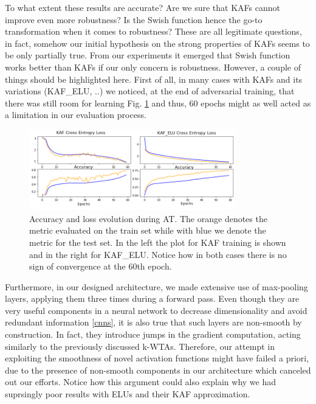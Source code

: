 \documentclass[LaM,binding=0.6cm]{./packages/sapthesis/sapthesis}
\begin{document}
        To what extent these results are accurate? Are we sure that KAFs cannot improve even more robustness?
        Is the Swish function hence the go-to transformation when it comes to robustness? These are all 
        legitimate questions, in fact, somehow our initial hypothesis on the strong properties of KAFs seems
        to be only partially true. From our experiments it emerged that Swish function works better than KAFs
        if our only concern is robustness. However, a couple of things should be highlighted here. First of all, 
        in many cases with KAFs and its variations (KAF\_ELU, ..) we noticed, at the end of adversarial 
        training, that there was still room for learning Fig. \ref{fig:vgghistory} and thus, 60 epochs might as well 
        acted as a limitation in our evaluation process. 
        \begin{figure}[h!]
            \centering
            \includegraphics[width=0.8\textwidth]{historyvgg.png}
            \caption{Accuracy and loss evolution during AT. The orange denotes the metric evaluated on the 
            train set while with blue we denote the metric for the test set. In the left the plot for 
            KAF training is shown and in the right for KAF\_ELU. Notice how in both cases there is 
            no sign of convergence at the 60th epoch.}
            \label{fig:vgghistory}
        \end{figure}
        Furthermore, in our designed architecture,
        we made extensive use of max-pooling layers, applying them three times during a forward pass. 
        Even though they are very useful components in a neural network to decrease dimensionality and 
        avoid redundant information \ref{cnns}, it is also true that such layers are non-smooth by construction.
        In fact, they introduce jumps in the gradient computation, acting similarly to the previously 
        discussed k-WTAs. Therefore, our attempt in exploiting the smoothness of novel activation functions 
        might have failed a priori, due to the presence of non-smooth components in our architecture which 
        canceled out our efforts. Notice how this argument could also explain why we had suprsingly poor 
        results with ELUs and their KAF approximation.
\end{document}
